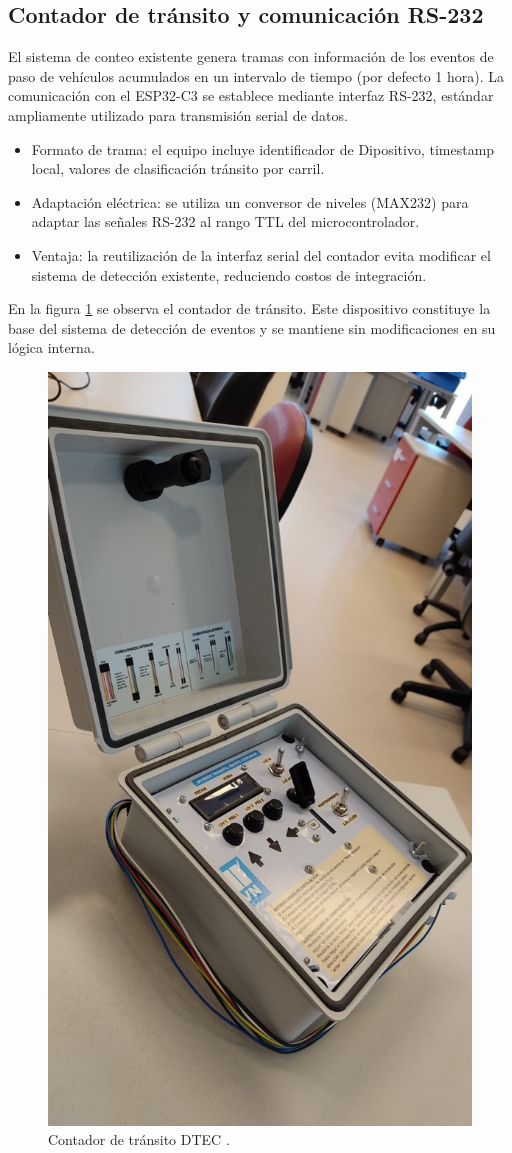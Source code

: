 \subsection{Contador de tránsito y comunicación RS-232}

El sistema de conteo existente genera tramas con información de los eventos de paso de vehículos acumulados en un intervalo de tiempo (por defecto 1 hora). La comunicación con el ESP32-C3 se establece mediante interfaz RS-232, estándar ampliamente utilizado para transmisión serial de datos.

\begin{itemize}
\item Formato de trama:  el equipo incluye identificador de Dipositivo, timestamp local, valores de clasificación tránsito por carril.

\item Adaptación eléctrica: se utiliza un conversor de niveles (MAX232) para adaptar las señales RS-232 al rango TTL del microcontrolador.

\item Ventaja: la reutilización de la interfaz serial del contador evita modificar el sistema de detección existente, reduciendo costos de integración.


\end{itemize}


En la figura \ref{fig:foto_dtec} se observa el contador de tránsito. Este dispositivo constituye la base del sistema de detección de eventos y se mantiene sin modificaciones en su lógica interna. 


\begin{figure}[htbp]
  \centering
  \includegraphics[width=0.5\linewidth]{./Figures/fotoDTEC.jpeg}
  \caption{Contador de tránsito DTEC \protect\footnotemark.}
  \label{fig:foto_dtec}
\end{figure}

